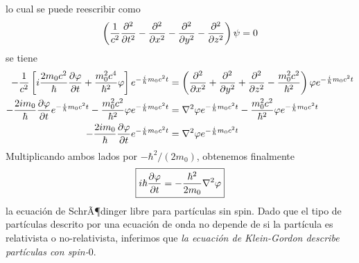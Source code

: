 lo cual se puede reescribir como
\begin{equation}
  \left(\frac{1}{c^2}\pdv[2]{t}-\pdv[2]{x}-\pdv[2]{y}-\pdv[2]{z}\right)\psi=0
\end{equation}
se tiene
\begin{align}
  -\frac{1}{c^2}\left[i\frac{2m_0c^2}{\hbar}\pdv{\varphi}{t}+\frac{m_0^2c^4}{\hbar^2}\varphi\right]e^{-\frac{i}{\hbar}m_0c^2t}&=\left(\pdv[2]{x}+\pdv[2]{y}+\pdv[2]{z}-\frac{m_0^2c^2}{\hbar^2}\right)\varphi e^{-\frac{i}{\hbar}m_0c^2t}\\
  -\frac{2im_0}{\hbar}\pdv{\varphi}{t}e^{-\frac{i}{\hbar}m_0c^2t}-\frac{m_0^2c^2}{\hbar^2}\varphi e^{-\frac{i}{\hbar}m_0c^2t}&=\nabla^2\varphi e^{-\frac{i}{\hbar}m_0c^2t}-\frac{m_0^2c^2}{\hbar^2}\varphi e^{-\frac{i}{\hbar}m_0c^2t}\\
  -\frac{2im_0}{\hbar}\pdv{\varphi}{t}e^{-\frac{i}{\hbar}m_0c^2t}&=\nabla^2\varphi e^{-\frac{i}{\hbar}m_0c^2t}
\end{align}
Multiplicando ambos lados por $-\hbar^2/(2m_0)$, obtenemos finalmente
\begin{equation}
\boxed{  i\hbar \pdv{\varphi}{t}=-\frac{\hbar^2}{2m_0}\nabla^2\varphi}
\end{equation}
la ecuación de SchrÃ¶dinger libre para partículas sin spin. Dado que el tipo de partículas descrito por una ecuación de onda no depende de si la partícula es relativista o no-relativista, inferimos que \textit{la ecuación de Klein-Gordon describe partículas con spin-$0$}.

